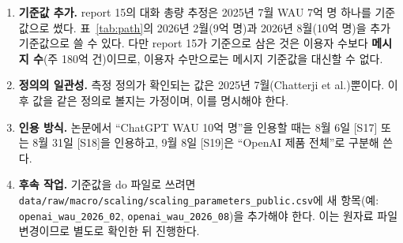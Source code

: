 \documentclass[11pt]{article}
\begin{document}
\begin{enumerate}[label=(\arabic*)]
  \item \textbf{기준값 추가.} report 15의 대화 총량 추정은 2025년 7월 WAU 7억 명 하나를 기준값으로 썼다. 표~\ref{tab:path}의 2026년 2월(9억 명)과 2026년 8월(10억 명)을 추가 기준값으로 쓸 수 있다. 다만 report 15가 기준으로 삼은 것은 이용자 수보다 \textbf{메시지 수}(주 180억 건)이므로, 이용자 수만으로는 메시지 기준값을 대신할 수 없다.
  \item \textbf{정의의 일관성.} 측정 정의가 확인되는 값은 2025년 7월(Chatterji et al.)뿐이다. 이후 값을 같은 정의로 볼지는 가정이며, 이를 명시해야 한다.
  \item \textbf{인용 방식.} 논문에서 ``ChatGPT WAU 10억 명''을 인용할 때는 8월 6일 [S17] 또는 8월 31일 [S18]을 인용하고, 9월 8일 [S19]은 ``OpenAI 제품 전체''로 구분해 쓴다.
  \item \textbf{후속 작업.} 기준값을 do 파일로 쓰려면 \texttt{data/raw/macro/scaling/scaling\_parameters\_public.csv}에 새 항목(예: \texttt{openai\_wau\_2026\_02}, \texttt{openai\_wau\_2026\_08})을 추가해야 한다. 이는 원자료 파일 변경이므로 별도로 확인한 뒤 진행한다.
\end{enumerate}

\printbibliography[title={참고문헌}]
\end{document}
